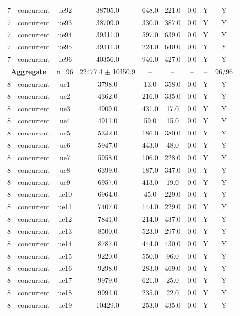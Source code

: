 \begin{table}[ht]
\begin{tabular}{|c|c|c|c|c|c|c|c|c|}
7 & concurrent & ue92 & 38705.0 & 648.0 & 221.0 & 0.0 & Y & Y \\
7 & concurrent & ue93 & 38709.0 & 330.0 & 387.0 & 0.0 & Y & Y \\
7 & concurrent & ue94 & 39311.0 & 597.0 & 639.0 & 0.0 & Y & Y \\
7 & concurrent & ue95 & 39311.0 & 224.0 & 640.0 & 0.0 & Y & Y \\
7 & concurrent & ue96 & 40356.0 & 946.0 & 427.0 & 0.0 & Y & Y \\
\multicolumn{2}{|c|}{\textbf{Aggregate}} & n=96 & 22477.4 $\pm$ 10350.9 & -- & -- & -- & -- & 96/96 \\
\hline
8 & concurrent & ue1 & 3798.0 & 13.0 & 358.0 & 0.0 & Y & Y \\
8 & concurrent & ue2 & 4362.0 & 216.0 & 335.0 & 0.0 & Y & Y \\
8 & concurrent & ue3 & 4909.0 & 431.0 & 17.0 & 0.0 & Y & Y \\
8 & concurrent & ue4 & 4911.0 & 59.0 & 15.0 & 0.0 & Y & Y \\
8 & concurrent & ue5 & 5342.0 & 186.0 & 380.0 & 0.0 & Y & Y \\
8 & concurrent & ue6 & 5947.0 & 443.0 & 48.0 & 0.0 & Y & Y \\
8 & concurrent & ue7 & 5958.0 & 106.0 & 228.0 & 0.0 & Y & Y \\
8 & concurrent & ue8 & 6399.0 & 187.0 & 347.0 & 0.0 & Y & Y \\
8 & concurrent & ue9 & 6957.0 & 413.0 & 19.0 & 0.0 & Y & Y \\
8 & concurrent & ue10 & 6964.0 & 45.0 & 229.0 & 0.0 & Y & Y \\
8 & concurrent & ue11 & 7407.0 & 144.0 & 229.0 & 0.0 & Y & Y \\
8 & concurrent & ue12 & 7841.0 & 214.0 & 437.0 & 0.0 & Y & Y \\
8 & concurrent & ue13 & 8500.0 & 523.0 & 297.0 & 0.0 & Y & Y \\
8 & concurrent & ue14 & 8787.0 & 444.0 & 430.0 & 0.0 & Y & Y \\
8 & concurrent & ue15 & 9220.0 & 550.0 & 96.0 & 0.0 & Y & Y \\
8 & concurrent & ue16 & 9298.0 & 283.0 & 469.0 & 0.0 & Y & Y \\
8 & concurrent & ue17 & 9979.0 & 621.0 & 25.0 & 0.0 & Y & Y \\
8 & concurrent & ue18 & 9991.0 & 235.0 & 22.0 & 0.0 & Y & Y \\
8 & concurrent & ue19 & 10429.0 & 253.0 & 435.0 & 0.0 & Y & Y \\

\end{tabular}
\end{table}
